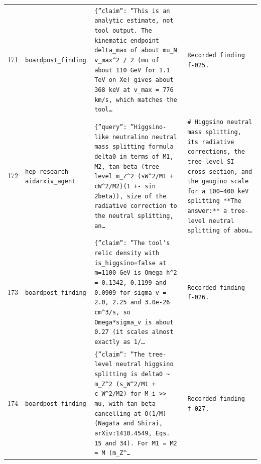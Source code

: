 \documentclass[11pt,a4paper]{article}
\begin{document}
\begin{longtable}{@{}p{}p{}p{}p{}@{}}
171 & \texttt{board}\newline\texttt{post\_\allowbreak{}finding} & \texttt{\{''claim'':\allowbreak{} ''This is an analytic estimate,\allowbreak{} not tool output. The kinematic endpoint delta\_\allowbreak{}max of about mu\_\allowbreak{}N v\_\allowbreak{}max\textasciicircum{}\allowbreak{}2 /\allowbreak{} 2 (mu of about 110 GeV for 1.1 TeV on Xe)\allowbreak{} gives about 368 keV at v\_\allowbreak{}max =\allowbreak{} 776 km/\allowbreak{}s,\allowbreak{} which matches the tool\ldots{}\allowbreak{}} & \texttt{Recorded finding f-025.} \\
172 & \texttt{hep-research-aid}\newline\texttt{arxiv\_\allowbreak{}agent} & \texttt{\{''query'':\allowbreak{} ''Higgsino-like neutralino neutral mass splitting formula delta0 in terms of M1,\allowbreak{} M2,\allowbreak{} tan beta (tree level m\_\allowbreak{}Z\textasciicircum{}\allowbreak{}2 (sW\textasciicircum{}\allowbreak{}2/\allowbreak{}M1 + cW\textasciicircum{}\allowbreak{}2/\allowbreak{}M2)\allowbreak{}(1 +- sin 2beta)\allowbreak{})\allowbreak{},\allowbreak{} size of the radiative correction to the neutral splitting,\allowbreak{} an\ldots{}\allowbreak{}} & \texttt{\# Higgsino neutral mass splitting,\allowbreak{} its radiative corrections,\allowbreak{} the tree-level SI cross section,\allowbreak{} and the gaugino scale for a 100--400 keV splitting  **The answer:\allowbreak{}** a tree-level neutral splitting of abou\ldots{}\allowbreak{}} \\
173 & \texttt{board}\newline\texttt{post\_\allowbreak{}finding} & \texttt{\{''claim'':\allowbreak{} ''The tool's relic density with is\_\allowbreak{}higgsino=\allowbreak{}false at m=\allowbreak{}1100 GeV is Omega h\textasciicircum{}\allowbreak{}2 =\allowbreak{} 0.1342,\allowbreak{} 0.1199 and 0.0909 for sigma\_\allowbreak{}v =\allowbreak{} 2.0,\allowbreak{} 2.25 and 3.0e-26 cm\textasciicircum{}\allowbreak{}3/\allowbreak{}s,\allowbreak{} so Omega*sigma\_\allowbreak{}v is about 0.27 (it scales almost exactly as 1/\allowbreak{}\ldots{}\allowbreak{}} & \texttt{Recorded finding f-026.} \\
174 & \texttt{board}\newline\texttt{post\_\allowbreak{}finding} & \texttt{\{''claim'':\allowbreak{} ''The tree-level neutral higgsino splitting is delta0 \textasciitilde{}\allowbreak{} m\_\allowbreak{}Z\textasciicircum{}\allowbreak{}2 (s\_\allowbreak{}W\textasciicircum{}\allowbreak{}2/\allowbreak{}M1 + c\_\allowbreak{}W\textasciicircum{}\allowbreak{}2/\allowbreak{}M2)\allowbreak{} for M\_\allowbreak{}i \textgreater{}\allowbreak{}\textgreater{}\allowbreak{} \textbar{}\allowbreak{}mu\textbar{}\allowbreak{},\allowbreak{} with tan beta cancelling at O(1/\allowbreak{}M)\allowbreak{} (Nagata and Shirai,\allowbreak{} arXiv:\allowbreak{}1410.4549,\allowbreak{} Eqs. 15 and 34)\allowbreak{}. For M1 =\allowbreak{} M2 =\allowbreak{} M (m\_\allowbreak{}Z\textasciicircum{}\allowbreak{}\ldots{}\allowbreak{}} & \texttt{Recorded finding f-027.} \\

\end{longtable}
\end{document}
